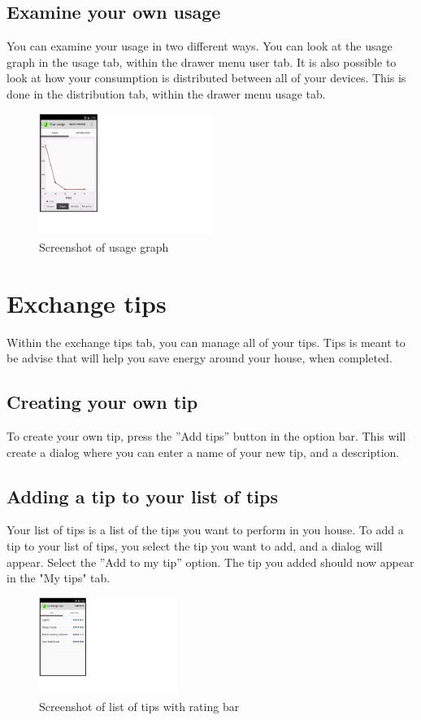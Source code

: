 \subsection{Examine your own usage}
You can examine your usage in two different ways. You can look at the usage graph in the usage tab, within the drawer menu user tab. It is also possible to look at how your consumption is distributed between all of your devices. This is done in the distribution tab, within the drawer menu usage tab. 

\begin{figure}[H]
\centering
\includegraphics[width=0.5\textwidth, clip, trim=0cm 4cm 19.5cm 0cm]{appendix/usermanual/fig/UsageGraph.png}
\caption{Screenshot of usage graph}
\end{figure}

\newpage
\section{Exchange tips}
Within the exchange tips tab, you can manage all of your tips. Tips is meant to be advise that will help you save energy around your house, when completed.

\subsection{Creating your own tip}
To create your own tip, press the ''Add tips'' button in the option bar. This will create a dialog where you can enter a name of your new tip, and a description.
\subsection{Adding a tip to your list of tips}
Your list of tips is a list of the tips you want to perform in you house. To add a tip to your list of tips, you select the tip you want to add, and a dialog will appear. Select the ''Add to my tip'' option. The tip you added should now appear in the "My tips" tab. 

\begin{figure}[H]
\centering
\includegraphics[width=0.4\textwidth, clip, trim=0cm 4cm 19.5cm 0cm]{appendix/usermanual/fig/Tipstab.png}
\caption{Screenshot of list of tips with rating bar}
\end{figure}


